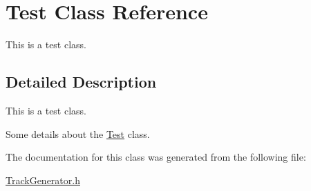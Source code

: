 \hypertarget{class_test}{}\section{Test Class Reference}
\label{class_test}


This is a test class.  




\subsection{Detailed Description}
This is a test class. 

Some details about the \mbox{\hyperlink{class_test}{Test}} class. 

The documentation for this class was generated from the following file\+:\begin{DoxyCompactItemize}
\item 
\mbox{\hyperlink{_track_generator_8h}{Track\+Generator.\+h}}\end{DoxyCompactItemize}
